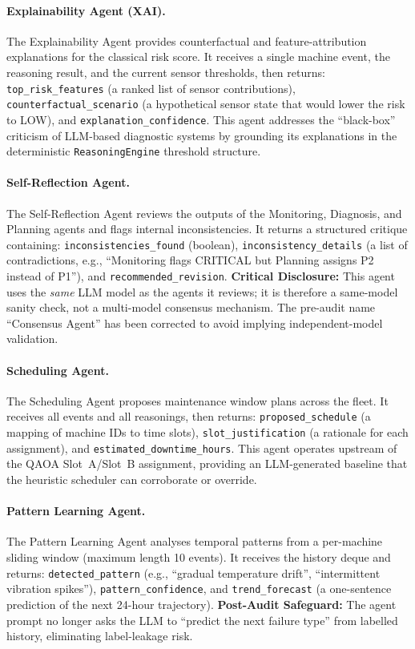 \paragraph{Explainability Agent (XAI).}
The Explainability Agent provides counterfactual and feature-attribution explanations for the classical risk score. It receives a single machine event, the reasoning result, and the current sensor thresholds, then returns: \texttt{top\_risk\_features} (a ranked list of sensor contributions), \texttt{counterfactual\_scenario} (a hypothetical sensor state that would lower the risk to LOW), and \texttt{explanation\_confidence}. This agent addresses the ``black-box'' criticism of LLM-based diagnostic systems by grounding its explanations in the deterministic \texttt{ReasoningEngine} threshold structure.

\paragraph{Self-Reflection Agent.}
The Self-Reflection Agent reviews the outputs of the Monitoring, Diagnosis, and Planning agents and flags internal inconsistencies. It returns a structured critique containing: \texttt{inconsistencies\_found} (boolean), \texttt{inconsistency\_details} (a list of contradictions, e.g., ``Monitoring flags CRITICAL but Planning assigns P2 instead of P1''), and \texttt{recommended\_revision}. \textbf{Critical Disclosure:} This agent uses the \emph{same} LLM model as the agents it reviews; it is therefore a same-model sanity check, not a multi-model consensus mechanism. The pre-audit name ``Consensus Agent'' has been corrected to avoid implying independent-model validation.

\paragraph{Scheduling Agent.}
The Scheduling Agent proposes maintenance window plans across the fleet. It receives all events and all reasonings, then returns: \texttt{proposed\_schedule} (a mapping of machine IDs to time slots), \texttt{slot\_justification} (a rationale for each assignment), and \texttt{estimated\_downtime\_hours}. This agent operates upstream of the QAOA Slot~A/Slot~B assignment, providing an LLM-generated baseline that the heuristic scheduler can corroborate or override.

\paragraph{Pattern Learning Agent.}
The Pattern Learning Agent analyses temporal patterns from a per-machine sliding window (maximum length 10 events). It receives the history deque and returns: \texttt{detected\_pattern} (e.g., ``gradual temperature drift'', ``intermittent vibration spikes''), \texttt{pattern\_confidence}, and \texttt{trend\_forecast} (a one-sentence prediction of the next 24-hour trajectory). \textbf{Post-Audit Safeguard:} The agent prompt no longer asks the LLM to ``predict the next failure type'' from labelled history, eliminating label-leakage risk.

